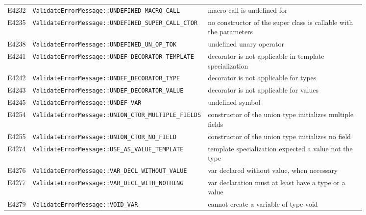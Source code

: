 \begin{longtable}{@{}l p{0.4\linewidth} p{0.45\linewidth}@{}}
E4232 & \texttt{ValidateErrorMessage::\allowbreak{}UNDEFINED\_\allowbreak{}MACRO\_\allowbreak{}CALL} & macro call is undefined for \errhole{}\\
E4235 & \texttt{ValidateErrorMessage::\allowbreak{}UNDEFINED\_\allowbreak{}SUPER\_\allowbreak{}CALL\_\allowbreak{}CTOR} & no constructor of the super class is callable with the parameters \errhole{}\\
E4238 & \texttt{ValidateErrorMessage::\allowbreak{}UNDEFINED\_\allowbreak{}UN\_\allowbreak{}OP\_\allowbreak{}TOK} & undefined unary operator \errhole{}\\
E4241 & \texttt{ValidateErrorMessage::\allowbreak{}UNDEF\_\allowbreak{}DECORATOR\_\allowbreak{}TEMPLATE} & decorator \errhole{} is not applicable in template specialization\\
E4242 & \texttt{ValidateErrorMessage::\allowbreak{}UNDEF\_\allowbreak{}DECORATOR\_\allowbreak{}TYPE} & decorator \errhole{} is not applicable for types\\
E4243 & \texttt{ValidateErrorMessage::\allowbreak{}UNDEF\_\allowbreak{}DECORATOR\_\allowbreak{}VALUE} & decorator \errhole{} is not applicable for values\\
E4245 & \texttt{ValidateErrorMessage::\allowbreak{}UNDEF\_\allowbreak{}VAR} & undefined symbol \errhole{}\\
E4254 & \texttt{ValidateErrorMessage::\allowbreak{}UNION\_\allowbreak{}CTOR\_\allowbreak{}MULTIPLE\_\allowbreak{}FIELDS} & constructor of the union type \errhole{} initializes multiple fields \errhole{}\\
E4255 & \texttt{ValidateErrorMessage::\allowbreak{}UNION\_\allowbreak{}CTOR\_\allowbreak{}NO\_\allowbreak{}FIELD} & constructor of the union type \errhole{} initializes no field\\
E4274 & \texttt{ValidateErrorMessage::\allowbreak{}USE\_\allowbreak{}AS\_\allowbreak{}VALUE\_\allowbreak{}TEMPLATE} & template specialization expected a value not the type \errhole{}\\
E4276 & \texttt{ValidateErrorMessage::\allowbreak{}VAR\_\allowbreak{}DECL\_\allowbreak{}WITHOUT\_\allowbreak{}VALUE} & var declared without value, when necessary\\
E4277 & \texttt{ValidateErrorMessage::\allowbreak{}VAR\_\allowbreak{}DECL\_\allowbreak{}WITH\_\allowbreak{}NOTHING} & var declaration must at least have a type or a value\\
E4279 & \texttt{ValidateErrorMessage::\allowbreak{}VOID\_\allowbreak{}VAR} & cannot create a variable of type void\\
\bottomrule
\end{longtable}
